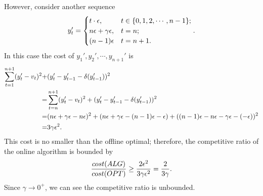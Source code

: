 However, consider another sequence
\begin{align}
    y'_t=\begin{cases}
    t\cdot\epsilon, & t\in\{0,1,2,\cdots,n-1\};\\
    n\epsilon+\gamma\epsilon, & t=n;\\
    (n-1)\epsilon & t=n+1.
    \end{cases}.\notag
\end{align}
In this case the cost of $y_1',y_2',\cdots,y_{n+1}'$ is
\begin{align}
    \sum_{t=1}^{n+1}(y_t'-v_t)^2+&(y_t'-y_{t-1}'-\delta(y_{t-1}'))^2\notag\\
    =&\sum_{t=n}^{n+1}(y_t'-v_t)^2+(y_t'-y_{t-1}'-\delta(y_{t-1}'))^2\notag\\
    =&(n\epsilon+\gamma\epsilon-n\epsilon)^2+(n\epsilon+\gamma\epsilon-(n-1)\epsilon-\epsilon)+((n-1)\epsilon-n\epsilon-\gamma\epsilon-(-\epsilon))^2\notag\\
    =&3\gamma\epsilon^2.\notag
\end{align}
This cost is no smaller than the offline optimal; therefore, the competitive ratio of the online algorithm is bounded by
\begin{align}
    \frac{cost(ALG)}{cost(OPT)}\ge\frac{2\epsilon^2}{3\gamma\epsilon^2}=\frac{2}{3\gamma}.\notag
\end{align}
Since $\gamma\to0^+$, we can see the competitive ratio is unbounded.